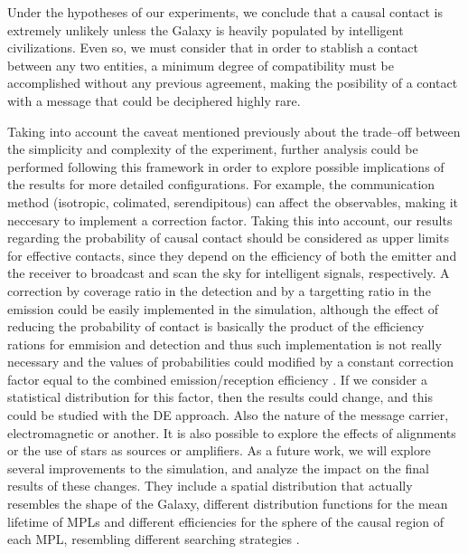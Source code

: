 \documentclass[crop]{CSLB}
\begin{document}
Under the hypotheses of our experiments, we conclude that a causal
contact is extremely unlikely unless the Galaxy is heavily populated
by intelligent civilizations.
%
Even so, we must consider that in order to stablish a contact between
any two entities, a minimum degree of compatibility must be
accomplished without any previous agreement, making the posibility of
a contact with a message that could be deciphered highly rare.



Taking into account the caveat mentioned previously about the
trade--off between the simplicity and complexity of the experiment,
further analysis could be performed following this framework in order to
explore possible implications of the results for more detailed
configurations.
%
For example, the communication method (isotropic, colimated,
serendipitous) can affect the observables, making it neccesary to
implement a correction factor.
%
Taking this into account, our results regarding the probability of
causal contact should be considered as upper limits for effective
contacts, since they depend on the
efficiency of both the emitter and the receiver to broadcast and scan
the sky for intelligent signals, respectively.
%
A correction by coverage ratio in the detection and by a targetting
ratio in the emission could be easily implemented in the simulation,
although the effect of reducing the probability of contact
is basically the product of the efficiency rations for emmision and
detection and thus 
such implementation is not really necessary
and the values of
probabilities could modified by a constant correction factor equal to
the combined emission/reception efficiency
\citep{smith_broadcasting_2009, anchordoqui_upper_2019,
forgan_collimated_2014}.
%
If we consider a statistical distribution for this factor, then the
results could change, and this could be studied with the DE approach.
%
Also the nature of the message carrier, electromagnetic or another.
%
It is also possible to explore the effects of alignments or the use of
stars as sources or amplifiers.
%
%
As a future work, we will explore several improvements to the
simulation, and analyze the impact on the final results of these
changes.
%
They include a spatial distribution that actually resembles the shape
of the Galaxy, different distribution functions for the mean lifetime
of MPLs and different efficiencies for the sphere of the causal region
of each MPL, resembling different searching strategies
\citep{hippke_interstellar_2017}.
\end{document}
